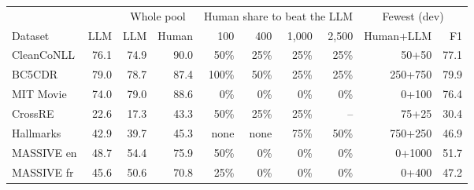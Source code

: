 \begin{tabular}{lrrrrrrrrr}
\toprule
 & & \multicolumn{2}{c}{Whole pool} & \multicolumn{4}{c}{Human share to beat the LLM} & \multicolumn{2}{c}{Fewest (dev)} \\
Dataset & LLM & LLM & Human & 100 & 400 & 1{,}000 & 2{,}500 & Human+LLM & F1 \\
\midrule
CleanCoNLL & 76.1 & 74.9 & 90.0 & 50\% & 25\% & 25\% & 25\% & 50+50 & 77.1 \\
BC5CDR & 79.0 & 78.7 & 87.4 & 100\% & 50\% & 25\% & 25\% & 250+750 & 79.9 \\
MIT Movie & 74.0 & 79.0 & 88.6 & 0\% & 0\% & 0\% & 0\% & 0+100 & 76.4 \\
CrossRE & 22.6 & 17.3 & 43.3 & 50\% & 25\% & 25\% & -- & 75+25 & 30.4 \\
Hallmarks & 42.9 & 39.7 & 45.3 & none & none & 75\% & 50\% & 750+250 & 46.9 \\
MASSIVE en & 48.7 & 54.4 & 75.9 & 50\% & 0\% & 0\% & 0\% & 0+1000 & 51.7 \\
MASSIVE fr & 45.6 & 50.6 & 70.8 & 25\% & 0\% & 0\% & 0\% & 0+400 & 47.2 \\
\bottomrule
\end{tabular}
